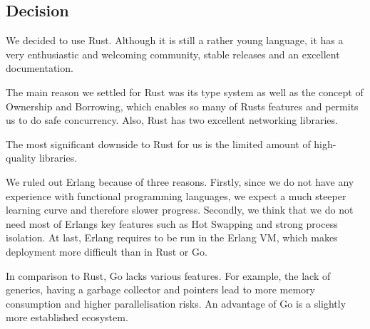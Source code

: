 \subsection{Decision}
We decided to use Rust. Although it is still a rather young language, it has a very enthusiastic and welcoming community, stable releases and an excellent documentation.

The main reason we settled for Rust was its type system as well as the concept of Ownership and Borrowing, which enables so many of Rusts features and permits us to do safe concurrency. Also, Rust has two excellent networking libraries.

The most significant downside to Rust for us is the limited amount of high-quality libraries.

We ruled out Erlang because of three reasons. Firstly, since we do not have any experience with functional programming languages, we expect a much steeper learning curve and therefore slower progress. Secondly, we think that we do not need most of Erlangs key features such as Hot Swapping and strong process isolation. At last, Erlang requires to be run in the Erlang VM, which makes deployment more difficult than in Rust or Go.

In comparison to Rust, Go lacks various features. For example, the lack of generics, having a garbage collector and pointers lead to more memory consumption and higher parallelisation risks. An advantage of Go is a slightly more established ecosystem.